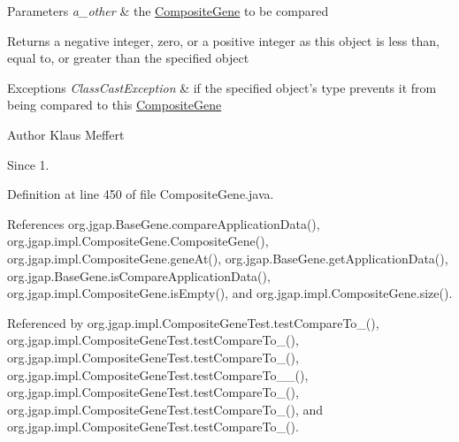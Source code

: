 \begin{DoxyParams}{Parameters}
{\em a\-\_\-other} & the \hyperlink{classorg_1_1jgap_1_1impl_1_1_composite_gene}{Composite\-Gene} to be compared \\
\hline
\end{DoxyParams}
\begin{DoxyReturn}{Returns}
a negative integer, zero, or a positive integer as this object is less than, equal to, or greater than the specified object
\end{DoxyReturn}

\begin{DoxyExceptions}{Exceptions}
{\em Class\-Cast\-Exception} & if the specified object's type prevents it from being compared to this \hyperlink{classorg_1_1jgap_1_1impl_1_1_composite_gene}{Composite\-Gene}\\
\hline
\end{DoxyExceptions}
\begin{DoxyAuthor}{Author}
Klaus Meffert 
\end{DoxyAuthor}
\begin{DoxySince}{Since}
1. 
\end{DoxySince}


Definition at line 450 of file Composite\-Gene.\-java.



References org.\-jgap.\-Base\-Gene.\-compare\-Application\-Data(), org.\-jgap.\-impl.\-Composite\-Gene.\-Composite\-Gene(), org.\-jgap.\-impl.\-Composite\-Gene.\-gene\-At(), org.\-jgap.\-Base\-Gene.\-get\-Application\-Data(), org.\-jgap.\-Base\-Gene.\-is\-Compare\-Application\-Data(), org.\-jgap.\-impl.\-Composite\-Gene.\-is\-Empty(), and org.\-jgap.\-impl.\-Composite\-Gene.\-size().



Referenced by org.\-jgap.\-impl.\-Composite\-Gene\-Test.\-test\-Compare\-To\-\_(), org.\-jgap.\-impl.\-Composite\-Gene\-Test.\-test\-Compare\-To\-\_(), org.\-jgap.\-impl.\-Composite\-Gene\-Test.\-test\-Compare\-To\-\_(), org.\-jgap.\-impl.\-Composite\-Gene\-Test.\-test\-Compare\-To\-\_\-\_(), org.\-jgap.\-impl.\-Composite\-Gene\-Test.\-test\-Compare\-To\-\_(), org.\-jgap.\-impl.\-Composite\-Gene\-Test.\-test\-Compare\-To\-\_(), and org.\-jgap.\-impl.\-Composite\-Gene\-Test.\-test\-Compare\-To\-\_().



